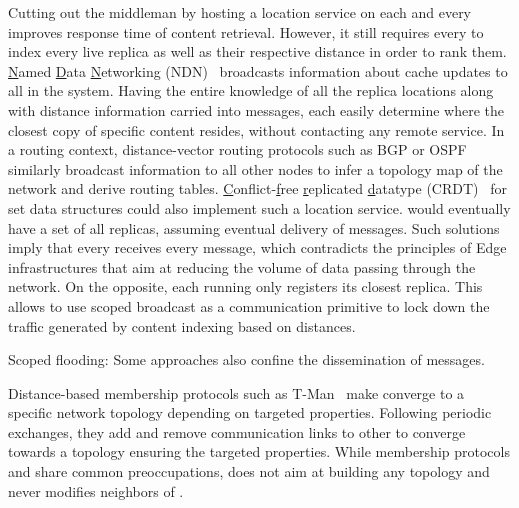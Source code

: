 \begin{asparadesc}
Cutting out the middleman by hosting a location service on each and
every \process improves response time of content retrieval. However,
it still requires every \process to index every live replica as well
as their respective distance in order to rank them.
\underline{N}amed \underline{D}ata \underline{N}etworking
(NDN)~\cite{nlsr} broadcasts information about cache updates to all
\nodes in the system. Having the entire knowledge of all the replica
locations along with distance information carried into messages, each
\node easily determine where the closest copy of specific content
resides, without contacting any remote
service. In a routing context, distance-vector routing protocols such as BGP or OSPF~\cite{ospf} similarly broadcast information to all other nodes to infer a topology map of the network and derive routing tables.
\underline{C}onflict-\underline{f}ree \underline{r}eplicated
\underline{d}atatype (CRDT)~\cite{shapiro2011crdts} for set data
structures could also implement such a location service. \Processes
would eventually have a set of all replicas, assuming eventual
delivery of messages.
\noindent Such solutions imply that every \process receives every
message, which contradicts the principles of Edge infrastructures that
aim at reducing the volume of data passing through the network. On the
opposite, each \process running \NAME only registers its closest
replica. This allows \NAME to use scoped broadcast as a communication
primitive to lock down the traffic generated by content indexing based
on distances.

\item [Scoped flooding:]
  Some approaches also confine the dissemination of messages.

\noindent Distance-based membership protocols such as
T-Man~\cite{t-man} make \processes converge to a specific network
topology depending on targeted properties. Following periodic
exchanges, they add and remove communication links to other \processes
to converge towards a topology ensuring the targeted properties.
While membership protocols and \NAME share common preoccupations,
\NAME does not aim at building any topology and never modifies
neighbors of \processes.


\end{asparadesc}
